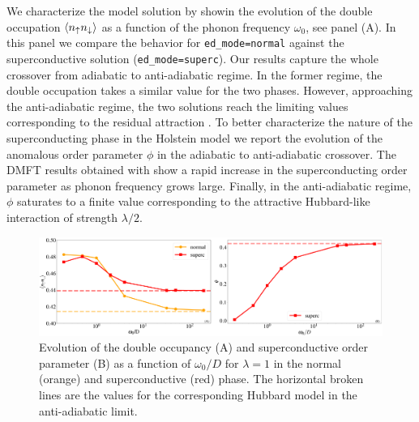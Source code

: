 \documentclass[edipack_sp.tex]{subfiles}
\begin{document}
We characterize the model solution by showin the evolution of the
double occupation $\langle n_{\uparrow}n_{\downarrow}\rangle$ as a function of the
phonon frequency $\omega_0$, see panel (A). In this panel we compare
the behavior for {\tt ed\_mode=normal} against the superconductive
solution ({\tt ed\_mode=superc}). Our results capture the whole
crossover from adiabatic to anti-adiabatic regime. In the former
regime, the double occupation takes a similar value for the two
phases. However, approaching the anti-adiabatic regime, the two
solutions reach the limiting values corresponding to the residual
attraction .   
To better characterize the nature of the superconducting
phase in the Holstein model we report the evolution of the anomalous order
parameter $\phi$ in the adiabatic to anti-adiabatic crossover.
The DMFT results obtained with \NAME show a rapid increase in the
superconducting order parameter as phonon frequency grows
large. Finally, in the anti-adiabatic regime, $\phi$ saturates to a
finite value corresponding to the attractive Hubbard-like interaction
of strength $\lambda/2$. 

\begin{figure}[ht!]
    \includegraphics[width=\linewidth]{figures/figBethe_Holstein.pdf}
    \caption{\label{figEx5}
      Evolution of the double occupancy (A) and superconductive order parameter (B) as a function of $\omega_0/D$ for $\lambda=1$ in the normal (orange) and superconductive (red) phase. The horizontal broken lines are the values for the corresponding Hubbard model in the anti-adiabatic limit.}
\end{figure}
\end{document}
